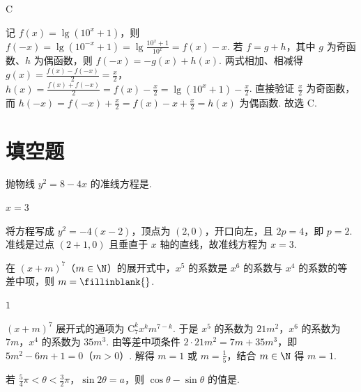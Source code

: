 \documentclass[UTF8,a4paper,oneside,11pt]{ctexbook}
\begin{document}
\begin{answer}
C
\end{answer}

\begin{solution}
记 \(f(x) = \lg \left(10^x + 1\right)\)，则 \(f(-x) = \lg \left(10^{-x} + 1\right) = \lg \frac{10^x + 1}{10^x} = f(x) - x\). 若 \(f = g + h\)，其中 \(g\) 为奇函数、\(h\) 为偶函数，则 \(f(-x) = -g(x) + h(x)\). 两式相加、相减得 \(g(x) = \frac{f(x) - f(-x)}{2} = \frac{x}{2}\)，\(h(x) = \frac{f(x) + f(-x)}{2} = f(x) - \frac{x}{2} = \lg \left(10^x + 1\right) - \frac{x}{2}\). 直接验证 \(\frac{x}{2}\) 为奇函数，而 \(h(-x) = f(-x) + \frac{x}{2} = f(x) - x + \frac{x}{2} = h(x)\) 为偶函数. 故选 C.
\end{solution}

\section{填空题}

\begin{problem}
抛物线 \(y^2 = 8 - 4x\) 的准线方程是\fillinblank{}.
\end{problem}

\begin{answer}
\(x = 3\)
\end{answer}

\begin{solution}
将方程写成 \(y^2 = -4(x - 2)\)，顶点为 \((2, 0)\)，开口向左，且 \(2p = 4\)，即 \(p = 2\). 准线是过点 \((2 + 1, 0)\) 且垂直于 \(x\) 轴的直线，故准线方程为 \(x = 3\).
\end{solution}

\begin{problem}
在 \((x + m)^7\)（\(m \in \N\)）的展开式中，\(x^5\) 的系数是 \(x^6\) 的系数与 \(x^4\) 的系数的等差中项，则 \(m =\fillinblank{}\).
\end{problem}

\begin{answer}
\(1\)
\end{answer}

\begin{solution}
\((x + m)^7\) 展开式的通项为 \(\mathrm C_7^k x^k m^{7-k}\). 于是 \(x^5\) 的系数为 \(21m^2\)，\(x^6\) 的系数为 \(7m\)，\(x^4\) 的系数为 \(35m^3\). 由等差中项条件 \(2 \cdot 21m^2 = 7m + 35m^3\)，即 \(5m^2 - 6m + 1 = 0\)（\(m > 0\)）. 解得 \(m = 1\) 或 \(m = \frac{1}{5}\)，结合 \(m \in \N\) 得 \(m = 1\).
\end{solution}

\begin{problem}
若 \(\frac{5}{4}\pi < \theta < \frac{3}{2}\pi\)，\(\sin 2\theta = a\)，则 \(\cos \theta - \sin \theta\) 的值是\fillinblank{}.
\end{problem}
\end{document}
